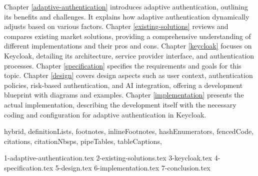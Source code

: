 \documentclass[
  digital,     %
  oneside,     %
  nosansbold,  %
  nocolorbold, %
  lof,         %
  nolot,         %
]{fithesis4}
\begin{document}
Chapter \ref{adaptive-authentication} introduces adaptive authentication, outlining its benefits and challenges.
It explains how adaptive authentication dynamically adjusts based on various factors.
Chapter \ref{existing-solutions} reviews and compares existing market solutions, providing a comprehensive understanding of different implementations and their pros and cons.
Chapter \ref{keycloak} focuses on Keycloak, detailing its architecture, service provider interface, and authentication processes.
Chapter \ref{specification} specifies the requirements and goals for this topic.
Chapter \ref{design} covers design aspects such as user context, authentication policies, risk-based authentication, and AI integration, offering a development blueprint with diagrams and examples.
Chapter \ref{implementation} presents the actual implementation, describing the development itself with the necessary coding and configuration for adaptive authentication in Keycloak.

\shorthandoff{-}
\begin{markdown*}{%
  hybrid,
  definitionLists,
  footnotes,
  inlineFootnotes,
  hashEnumerators,
  fencedCode,
  citations,
  citationNbsps,
  pipeTables,
  tableCaptions,
}

{1-adaptive-authentication.tex}
{2-existing-solutions.tex}
{3-keycloak.tex}
{4-specification.tex}
{5-design.tex}
{6-implementation.tex}
{7-conclusion.tex}

\end{markdown*}
\end{document}
